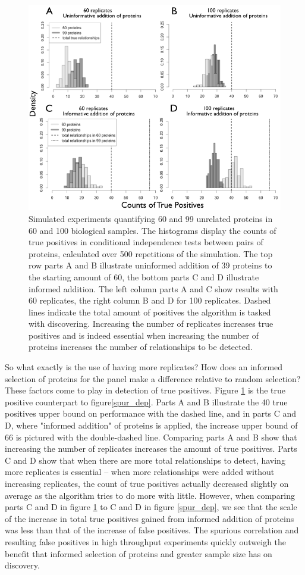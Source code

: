 \documentclass[journal=jacsat,manuscript=article]{achemso}
\def\added#1{{\color{blue} #1}}
\begin{document}
\begin{figure}[!tpb]
\centerline{\includegraphics[width=.8\textwidth]{figs/true_pos.png}}
\caption{Simulated experiments quantifying 60 and 99 unrelated proteins in 60 and 100 biological samples. The histograms display the counts of true positives in conditional independence tests between pairs of proteins, calculated over 500 repetitions of the simulation. The top row parts A and B illustrate uninformed addition of 39 proteins to the starting amount of 60, the bottom parts C and D illustrate informed addition.  The left column parts A and C show results with 60 replicates, the right column B and D for 100 replicates.  Dashed lines indicate the total amount of positives the algorithm is tasked with discovering.  Increasing the number of replicates increases true positives and is indeed essential when increasing the number of proteins increases the number of relationships to be detected.}
\label{true_pos}
\end{figure}

\added{So what exactly is the use of having more replicates? How does an informed selection of proteins for the panel make a difference relative to random selection?  These factors come to play in detection of true positives.  Figure \ref{true_pos} is the true positive counterpart to figure\ref{spur_dep}.  Parts A and B illustrate the 40 true positives upper bound on performance with the dashed line, and in parts C and D, where "informed addition" of proteins is applied, the increase upper bound of 66 is pictured with the double-dashed line.  Comparing parts A and B show that increasing the number of replicates increases the amount of true positives.  Parts C and D show that when there are more total relationships to detect, having more replicates is essential -- when more relationships were added without increasing replicates, the count of true positives actually decreased slightly on average as the algorithm tries to do more with little.  However, when comparing parts C and D in figure \ref{true_pos} to C and D in figure \ref{spur_dep}, we see that the scale of the increase in total true positives gained from informed addition of proteins was less than that of the increase of false positives.  The spurious correlation and resulting false positives in high throughput experiments quickly outweigh the benefit that informed selection of proteins and greater sample size has on discovery.}
\end{document}
